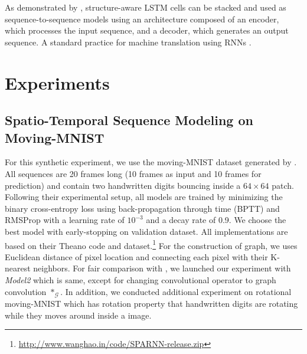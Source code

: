 \documentclass{article} %
\newcommand{\G}{\mathcal{G}}
\begin{document}
As demonstrated by \citet{convlstm}, structure-aware LSTM cells can be stacked
and used as sequence-to-sequence models using an architecture composed of an
encoder, which processes the input sequence, and a decoder, which generates an
output sequence. A standard practice for machine translation using RNNs
\citep{gru, seq2seq}.




\section{Experiments}
\label{experiments}


\subsection{Spatio-Temporal Sequence Modeling on Moving-MNIST}

For this synthetic experiment, we use the moving-MNIST dataset generated by
\citet{convlstm}. All sequences are 20 frames long (10 frames as input and 10
frames for prediction) and contain two handwritten digits bouncing inside a $64
\times 64$ patch. Following their experimental setup, all models are trained by
minimizing the binary cross-entropy loss using back-propagation through time (BPTT)
and RMSProp with a learning rate of $10^{-3}$ and a decay rate of 0.9. We choose the best model with early-stopping on validation dataset. All
implementations are based on their Theano code and
dataset.\footnote{\url{http://www.wanghao.in/code/SPARNN-release.zip}} For the construction of graph, we uses Euclidean distance of pixel location and connecting each pixel with their K-nearest neighbors. For fair comparison with \citep{convlstm}, we launched our experiment with {\it Model2} which is same, except for changing convolutional operator to graph convolution $\ast_\G$. In addition, we conducted additional experiment on rotational moving-MNIST which has rotation property that handwritten digits are rotating while they moves around inside a image. 
\end{document}
